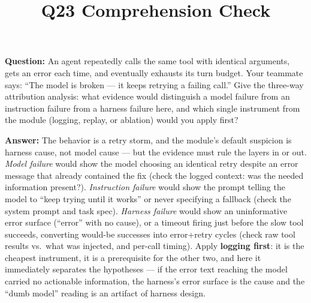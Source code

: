 \documentclass[11pt]{article}
\title{Q23 Comprehension Check}
\date{}
\begin{document}
\maketitle
\textbf{Question:} An agent repeatedly calls the same tool with identical arguments, gets an error each time, and eventually exhausts its turn budget. Your teammate says: ``The model is broken --- it keeps retrying a failing call.'' Give the three-way attribution analysis: what evidence would distinguish a model failure from an instruction failure from a harness failure here, and which single instrument from the module (logging, replay, or ablation) would you apply first?

\vspace{1em}
\textbf{Answer:} The behavior is a retry storm, and the module's default suspicion is harness cause, not model cause --- but the evidence must rule the layers in or out. \emph{Model failure} would show the model choosing an identical retry despite an error message that already contained the fix (check the logged context: was the needed information present?). \emph{Instruction failure} would show the prompt telling the model to ``keep trying until it works'' or never specifying a fallback (check the system prompt and task spec). \emph{Harness failure} would show an uninformative error surface (``error'' with no cause), or a timeout firing just before the slow tool succeeds, converting would-be successes into error+retry cycles (check raw tool results vs.\ what was injected, and per-call timing). Apply \textbf{logging first}: it is the cheapest instrument, it is a prerequisite for the other two, and here it immediately separates the hypotheses --- if the error text reaching the model carried no actionable information, the harness's error surface is the cause and the ``dumb model'' reading is an artifact of harness design.
\end{document}
